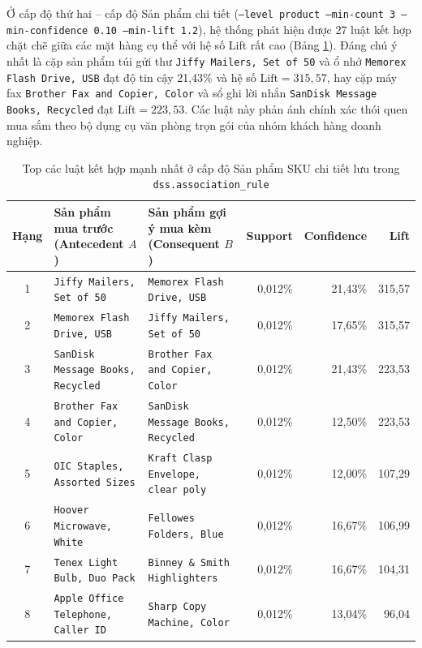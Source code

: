 Ở cấp độ thứ hai -- cấp độ Sản phẩm chi tiết (\texttt{--level product --min-count 3 --min-confidence 0.10 --min-lift 1.2}), hệ thống phát hiện được 27 luật kết hợp chặt chẽ giữa các mặt hàng cụ thể với hệ số Lift rất cao (Bảng \ref{tab:assoc_product}). Đáng chú ý nhất là cặp sản phẩm túi gửi thư \texttt{Jiffy Mailers, Set of 50} và ổ nhớ \texttt{Memorex Flash Drive, USB} đạt độ tin cậy 21,43\% và hệ số $\text{Lift} = 315,57$, hay cặp máy fax \texttt{Brother Fax and Copier, Color} và sổ ghi lời nhắn \texttt{SanDisk Message Books, Recycled} đạt $\text{Lift} = 223,53$. Các luật này phản ánh chính xác thói quen mua sắm theo bộ dụng cụ văn phòng trọn gói của nhóm khách hàng doanh nghiệp.

\begin{table}[H]
\centering
\caption{Top các luật kết hợp mạnh nhất ở cấp độ Sản phẩm SKU chi tiết lưu trong \texttt{dss.association\_rule}}
\label{tab:assoc_product}
\footnotesize
\renewcommand{\arraystretch}{1.22}
\begin{tabularx}{\textwidth}{|c|X|X|r|r|r|}
\hline
\textbf{Hạng} & \textbf{Sản phẩm mua trước (Antecedent $A$)} & \textbf{Sản phẩm gợi ý mua kèm (Consequent $B$)} & \textbf{Support} & \textbf{Confidence} & \textbf{Lift} \\
\hline
1 & \texttt{Jiffy Mailers, Set of 50} & \texttt{Memorex Flash Drive, USB} & 0,012\% & 21,43\% & 315,57 \\
\hline
2 & \texttt{Memorex Flash Drive, USB} & \texttt{Jiffy Mailers, Set of 50} & 0,012\% & 17,65\% & 315,57 \\
\hline
3 & \texttt{SanDisk Message Books, Recycled} & \texttt{Brother Fax and Copier, Color} & 0,012\% & 21,43\% & 223,53 \\
\hline
4 & \texttt{Brother Fax and Copier, Color} & \texttt{SanDisk Message Books, Recycled} & 0,012\% & 12,50\% & 223,53 \\
\hline
5 & \texttt{OIC Staples, Assorted Sizes} & \texttt{Kraft Clasp Envelope, clear poly} & 0,012\% & 12,00\% & 107,29 \\
\hline
6 & \texttt{Hoover Microwave, White} & \texttt{Fellowes Folders, Blue} & 0,012\% & 16,67\% & 106,99 \\
\hline
7 & \texttt{Tenex Light Bulb, Duo Pack} & \texttt{Binney \& Smith Highlighters} & 0,012\% & 16,67\% & 104,31 \\
\hline
8 & \texttt{Apple Office Telephone, Caller ID} & \texttt{Sharp Copy Machine, Color} & 0,012\% & 13,04\% & 96,04 \\
\hline
\end{tabularx}
\end{table}

